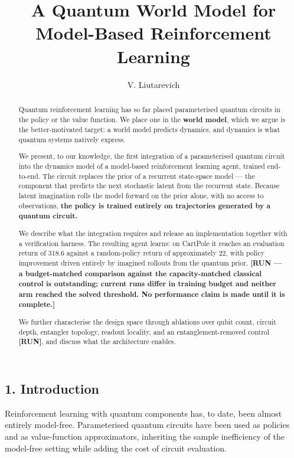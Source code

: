 \documentclass[
  11pt]{article}
\title{A Quantum World Model for Model-Based Reinforcement Learning}
\author{V. Liutarevich}
\date{}
\begin{document}
\maketitle
\begin{abstract}
Quantum reinforcement learning has so far placed parameterised quantum
circuits in the policy or the value function. We place one in the
\textbf{world model}, which we argue is the better-motivated target: a
world model predicts dynamics, and dynamics is what quantum systems
natively express.

We present, to our knowledge, the first integration of a parameterised
quantum circuit into the dynamics model of a model-based reinforcement
learning agent, trained end-to-end. The circuit replaces the prior of a
recurrent state-space model --- the component that predicts the next
stochastic latent from the recurrent state. Because latent imagination
rolls the model forward on the prior alone, with no access to
observations, \textbf{the policy is trained entirely on trajectories
generated by a quantum circuit.}

We describe what the integration requires and release an implementation
together with a verification harness. The resulting agent learns: on
CartPole it reaches an evaluation return of 318.6 against a
random-policy return of approximately 22, with policy improvement driven
entirely by imagined rollouts from the quantum prior. \textbf{{[}RUN ---
a budget-matched comparison against the capacity-matched classical
control is outstanding; current runs differ in training budget and
neither arm reached the solved threshold. No performance claim is made
until it is complete.{]}}

We further characterise the design space through ablations over qubit
count, circuit depth, entangler topology, readout locality, and an
entanglement-removed control \textbf{{[}RUN{]}}, and discuss what the
architecture enables.
\end{abstract}

\hypertarget{introduction}{%
\subsection{1. Introduction}\label{introduction}}

Reinforcement learning with quantum components has, to date, been almost
entirely model-free. Parameterised quantum circuits have been used as
policies and as value-function approximators, inheriting the sample
inefficiency of the model-free setting while adding the cost of circuit
evaluation.
\end{document}
